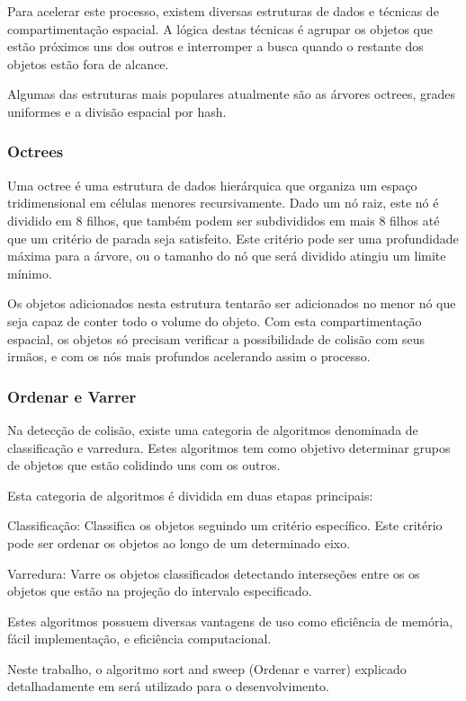 Para acelerar este processo, existem diversas estruturas de dados e técnicas de compartimentação espacial.
A lógica destas técnicas é agrupar os objetos que estão próximos uns dos outros
e interromper a busca quando o restante dos objetos estão fora de alcance.

Algumas das estruturas mais populares atualmente são as árvores octrees, grades
uniformes e a divisão espacial por hash.

\subsubsection{Octrees}

Uma octree é uma estrutura de dados hierárquica que organiza um espaço
tridimensional em células menores recursivamente.
Dado um nó raiz, este nó é dividido em 8  filhos, que também podem ser
subdivididos em mais 8 filhos até que um critério de parada seja satisfeito.
Este critério pode ser uma profundidade máxima para a árvore, ou o tamanho do
nó que será dividido atingiu um limite mínimo.

Os objetos adicionados nesta estrutura tentarão ser adicionados no menor nó que
seja capaz de conter todo o volume do objeto. Com esta compartimentação
espacial, os objetos só precisam verificar a possibilidade de colisão com seus
irmãos, e com os nós mais profundos acelerando assim o processo.

\subsubsection{Ordenar e Varrer}

Na detecção de colisão, existe uma categoria de algoritmos denominada de
classificação e varredura. Estes algoritmos tem como objetivo determinar grupos
de objetos que estão colidindo uns com os outros.

Esta categoria de algoritmos é dividida em duas etapas principais:

Classificação: Classifica os objetos seguindo um critério específico. Este
critério pode ser ordenar os objetos ao longo de um determinado eixo.

Varredura: Varre os objetos classificados detectando interseções entre os os
objetos que estão na projeção do intervalo especificado.

Estes algoritmos possuem diversas vantagens de uso como eficiência de memória,
fácil implementação, e eficiência computacional.

Neste trabalho, o algoritmo sort and sweep (Ordenar e varrer) explicado
detalhadamente em  será utilizado para o desenvolvimento.

